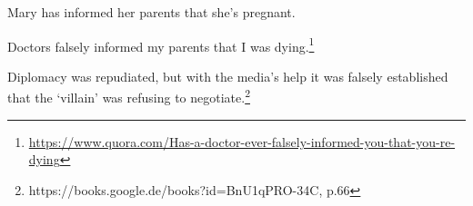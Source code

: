 \documentclass[11pt,fleqn]{article}
\def\infelic{{\leavevmode\llap{\#}}}
\newcommand{\6}{\mbox{$[\hspace*{-.6mm}[$}}
\newcommand{\9}{\mbox{$]\hspace*{-.6mm}]$}}
\begin{document}
\begin{exe}
\ex\label{inform} 

\begin{xlist}

\ex Mary has informed her parents that she's pregnant.

\ex Doctors falsely informed my parents that I was dying.\footnote{\url{https://www.quora.com/Has-a-doctor-ever-falsely-informed-you-that-you-re-dying}}

\end{xlist}

\ex\label{establish} Diplomacy was repudiated, but with the media's help it was falsely established that the `villain' was refusing to negotiate.\footnote{https://books.google.de/books?id=BnU1qPRO-34C, p.66}
\end{exe}




%
%
%
%
%
%

%
%
%
%
%
\end{document}
